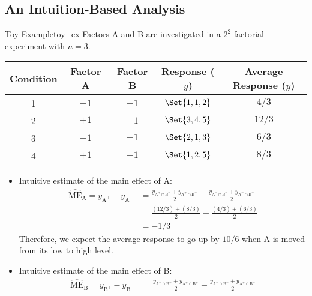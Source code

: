 \subsection{An Intuition-Based Analysis}
\begin{Example}{Toy Example}{toy_ex}
    Factors A and B are investigated in a $ 2^2 $ factorial experiment with $ n=3 $.
    \begin{center}
        \begin{NiceTabular}{ccc|cc}
            \toprule
            Condition & Factor A & Factor B & Response ($ y $) & Average Response ($ \bar{y} $)\\
             & $ -1 $ & $ -1 $ & $ \Set{1,1,2} $ & $ 4/3 $\\
            2 & $ +1 $ & $ -1 $ & $ \Set{3,4,5} $ & $ 12/3 $\\
            3 & $ -1 $ & $ +1 $ & $ \Set{2,1,3} $ & $ 6/3 $\\
            4 & $ +1 $ & $ +1 $ & $ \Set{1,2,5} $ & $ 8/3 $\\
            \bottomrule
        \end{NiceTabular}
    \end{center}
    \begin{itemize}
        \item Intuitive estimate of the main effect of A\@:
              \begin{align*}
                  \widehat{\text{ME}}_{\text{A}}=\bar{y}_{\text{A}^+}-\bar{y}_{\text{A}^-}
                   & =\frac{\bar{y}_{\text{A}^+\cap \text{B}^-}+\bar{y}_{\text{A}^+\cap \text{B}^+}}{2}
                  -\frac{\bar{y}_{\text{A}^-\cap \text{B}^-}+\bar{y}_{\text{A}^-\cap \text{B}^+}}{2}    \\
                   & =\frac{(12/3)+(8/3)}{2}-\frac{(4/3)+(6/3)}{2}                                      \\
                   & =-1/3
              \end{align*}
              Therefore, we expect the average response to go up by $ 10/6 $ when A is moved from its low to high level.
        \item Intuitive estimate of the main effect of B\@:
              \begin{align*}
                  \widehat{\text{ME}}_{\text{B}}=\bar{y}_{\text{B}^+}-\bar{y}_{\text{B}^-}
                   & =\frac{\bar{y}_{\text{A}^-\cap \text{B}^+}+\bar{y}_{\text{A}^+\cap \text{B}^+}}{2}
                  -\frac{\bar{y}_{\text{A}^-\cap \text{B}^-}+\bar{y}_{\text{A}^+\cap \text{B}^-}}{2}    \\

\end{align*}
\end{itemize}
\end{Example}
